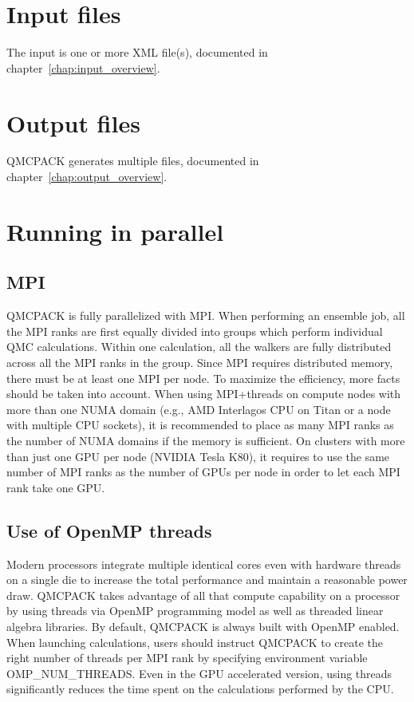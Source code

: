 \section{Input files}
\label{sec:inputs}
The input is one or more XML file(s), documented in chapter~\ref{chap:input_overview}.

\section{Output files}
QMCPACK generates multiple files, documented in chapter~\ref{chap:output_overview}.

\section{Running in parallel}
\label{sec:parallelrunning}


\subsection{MPI}
QMCPACK is fully parallelized with MPI. When performing an ensemble job, all
the MPI ranks are first equally divided into groups which perform individual
QMC calculations. Within one calculation, all the walkers are fully distributed
across all the MPI ranks in the group. Since MPI requires distributed memory,
there must be at least one MPI per node. To maximize the efficiency, more facts
should be taken into account. When using MPI+threads on compute nodes with more
than one NUMA domain (e.g., AMD Interlagos CPU on Titan or a node with multiple
CPU sockets), it is recommended to place as many MPI ranks as the number of
NUMA domains if the memory is sufficient. On clusters with more than just one
GPU per node (NVIDIA Tesla K80), it requires to use the same number of MPI
ranks as the number of GPUs per node in order to let each MPI rank take one GPU.

\subsection{Use of OpenMP threads}
\label{sec:openmprunning}
Modern processors integrate multiple identical cores even with hardware threads
on a single die to increase the total performance and maintain a reasonable
power draw. QMCPACK takes advantage of all that compute capability on a
processor by using threads via OpenMP programming model as well as threaded linear algebra libraries. By default, QMCPACK is always built with OpenMP enabled. When launching calculations, users should instruct QMCPACK to create the right number of threads per MPI rank by specifying environment variable OMP\_NUM\_THREADS. Even in the GPU accelerated version, using threads significantly reduces the time spent on the calculations performed by the CPU.

